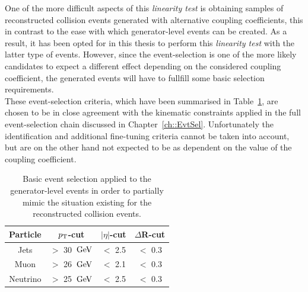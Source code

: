 One of the more difficult aspects of this \textit{linearity test} is obtaining samples of reconstructed collision events generated with alternative coupling coefficients, this in contrast to the ease with which generator-level events can be created. As a result, it has been opted for in this thesis to perform this \textit{linearity test} with the latter type of events.
However, since the event-selection is one of the more likely candidates to expect a different effect depending on the considered coupling coefficient, the generated events will have to fullfill some basic selection requirements.
\\
These event-selection criteria, which have been summarised in Table~\ref{table::GenCuts}, are chosen to be in close agreement with the kinematic constraints applied in the full event-selection chain discussed in Chapter~\ref{ch::EvtSel}. Unfortunately the identification and additional fine-tuning criteria cannot be taken into account, but are on the other hand not expected to be as dependent on the value of the coupling coefficient.
\begin{table}[h!t]
 \centering
 \caption{Basic event selection applied to the generator-level events in order to partially mimic the situation existing for the reconstructed collision events.} \label{table::GenCuts}
 \begin{tabular}{c|c|c|c}
  Particle 	& $p_{\rm T}$-cut 		& $\vert \eta \vert$-cut 	& $\Delta$R-cut 	\\
  \hline
  Jets 		& $>$ 30 $\, \mathrm{GeV}$ 	& $<$ 2.5			& $<$ 0.3		\\
  Muon		& $>$ 26 $\, \mathrm{GeV}$		& $<$ 2.1			& $<$ 0.3		\\
  Neutrino 	& $>$ 25 $\, \mathrm{GeV}$		& $<$ 2.5			& $<$ 0.3		
 \end{tabular}
\end{table}

